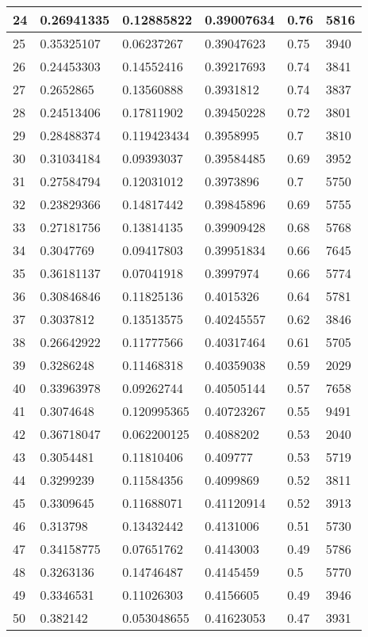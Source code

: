 \begin{longtable}{|l|l|l|l|l|l|}
24 & 0.26941335 & 0.12885822 & 0.39007634 & 0.76 & 5816 \\ \hline 
25 & 0.35325107 & 0.06237267 & 0.39047623 & 0.75 & 3940 \\ \hline 
26 & 0.24453303 & 0.14552416 & 0.39217693 & 0.74 & 3841 \\ \hline 
27 & 0.2652865 & 0.13560888 & 0.3931812 & 0.74 & 3837 \\ \hline 
28 & 0.24513406 & 0.17811902 & 0.39450228 & 0.72 & 3801 \\ \hline 
29 & 0.28488374 & 0.119423434 & 0.3958995 & 0.7 & 3810 \\ \hline 
30 & 0.31034184 & 0.09393037 & 0.39584485 & 0.69 & 3952 \\ \hline 
31 & 0.27584794 & 0.12031012 & 0.3973896 & 0.7 & 5750 \\ \hline 
32 & 0.23829366 & 0.14817442 & 0.39845896 & 0.69 & 5755 \\ \hline 
33 & 0.27181756 & 0.13814135 & 0.39909428 & 0.68 & 5768 \\ \hline 
34 & 0.3047769 & 0.09417803 & 0.39951834 & 0.66 & 7645 \\ \hline 
35 & 0.36181137 & 0.07041918 & 0.3997974 & 0.66 & 5774 \\ \hline 
36 & 0.30846846 & 0.11825136 & 0.4015326 & 0.64 & 5781 \\ \hline 
37 & 0.3037812 & 0.13513575 & 0.40245557 & 0.62 & 3846 \\ \hline 
38 & 0.26642922 & 0.11777566 & 0.40317464 & 0.61 & 5705 \\ \hline 
39 & 0.3286248 & 0.11468318 & 0.40359038 & 0.59 & 2029 \\ \hline 
40 & 0.33963978 & 0.09262744 & 0.40505144 & 0.57 & 7658 \\ \hline 
41 & 0.3074648 & 0.120995365 & 0.40723267 & 0.55 & 9491 \\ \hline 
42 & 0.36718047 & 0.062200125 & 0.4088202 & 0.53 & 2040 \\ \hline 
43 & 0.3054481 & 0.11810406 & 0.409777 & 0.53 & 5719 \\ \hline 
44 & 0.3299239 & 0.11584356 & 0.4099869 & 0.52 & 3811 \\ \hline 
45 & 0.3309645 & 0.11688071 & 0.41120914 & 0.52 & 3913 \\ \hline 
46 & 0.313798 & 0.13432442 & 0.4131006 & 0.51 & 5730 \\ \hline 
47 & 0.34158775 & 0.07651762 & 0.4143003 & 0.49 & 5786 \\ \hline 
48 & 0.3263136 & 0.14746487 & 0.4145459 & 0.5 & 5770 \\ \hline 
49 & 0.3346531 & 0.11026303 & 0.4156605 & 0.49 & 3946 \\ \hline 
50 & 0.382142 & 0.053048655 & 0.41623053 & 0.47 & 3931 \\ \hline 
\end{longtable}
